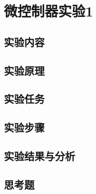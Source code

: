 \chapter{微控制器实验1}

\section{实验内容}

\section{实验原理}

\section{实验任务}

\section{实验步骤}

\section{实验结果与分析}

\section{思考题}